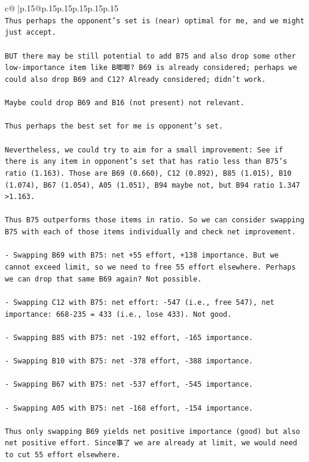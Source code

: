 \documentclass{article}
\begin{document}
{\begin{supertabular}{c@{$\;$}|p{.15\linewidth}@{}p{.15\linewidth}p{.15\linewidth}p{.15\linewidth}p{.15\linewidth}p{.15\linewidth}}
{{{\\ 
\texttt{Thus perhaps the opponent's set is (near) optimal for me, and we might just accept.} \\
\\ 
\texttt{BUT there may be still potential to add B75 and also drop some other low{-}importance item like B唧唧? B69 is already considered; perhaps we could also drop B69 and C12? Already considered; didn't work.} \\
\\ 
\texttt{Maybe could drop B69 and B16 (not present) not relevant.} \\
\\ 
\texttt{Thus perhaps the best set for me is opponent's set.} \\
\\ 
\texttt{Nevertheless, we could try to aim for a small improvement: See if there is any item in opponent's set that has ratio less than B75's ratio (1.163). Those are B69 (0.660), C12 (0.892), B85 (1.015), B10 (1.074), B67 (1.054), A05 (1.051), B94 maybe not, but B94 ratio 1.347 >1.163.} \\
\\ 
\texttt{Thus B75 outperforms those items in ratio. So we can consider swapping B75 with each of those items individually and check net improvement.} \\
\\ 
\texttt{{-} Swapping B69 with B75: net +55 effort, +138 importance. But we cannot exceed limit, so we need to free 55 effort elsewhere. Perhaps we can drop that same B69 again? Not possible.} \\
\\ 
\texttt{{-} Swapping C12 with B75: net effort: {-}547 (i.e., free 547), net importance: 668{-}235 = 433 (i.e., lose 433). Not good.} \\
\\ 
\texttt{{-} Swapping B85 with B75: net {-}192 effort, {-}165 importance.} \\
\\ 
\texttt{{-} Swapping B10 with B75: net {-}378 effort, {-}388 importance.} \\
\\ 
\texttt{{-} Swapping B67 with B75: net {-}537 effort, {-}545 importance.} \\
\\ 
\texttt{{-} Swapping A05 with B75: net {-}168 effort, {-}154 importance.} \\
\\ 
\texttt{Thus only swapping B69 yields net positive importance (good) but also net positive effort. Since事了 we are already at limit, we would need to cut 55 effort elsewhere.} \\
}}}
\end{supertabular}}
\end{document}
